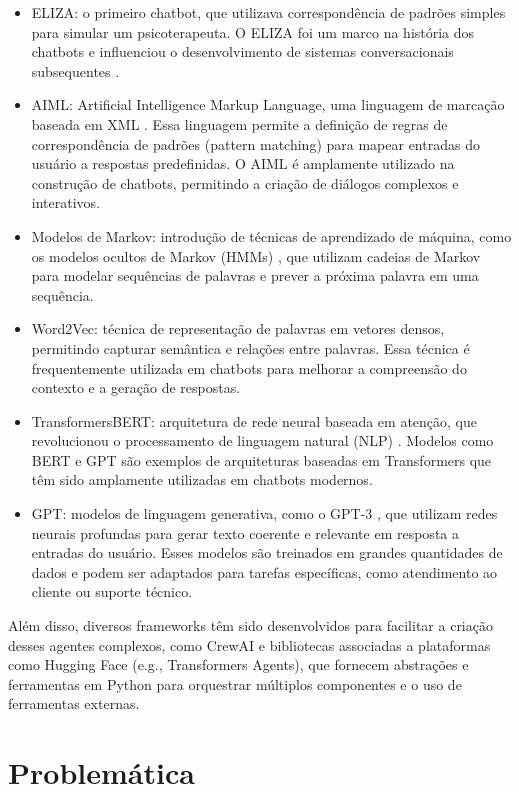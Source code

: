\documentclass[14pt,a4paper,oneside]{book}
\begin{document}
\begin{itemize}
	\item ELIZA: o primeiro chatbot, que utilizava correspondência de padrões simples para simular um psicoterapeuta. O ELIZA foi um marco na história dos chatbots e influenciou o desenvolvimento de sistemas conversacionais subsequentes \cite{Weizenbaum1996}.
	\item AIML: Artificial Intelligence Markup Language, uma linguagem de marcação baseada em XML \cite{Wallace2000}. Essa linguagem permite a definição de regras de correspondência de padrões (pattern matching) para mapear entradas do usuário a respostas predefinidas. O AIML é amplamente utilizado na construção de chatbots, permitindo a criação de diálogos complexos e interativos.
	\item Modelos de Markov: introdução de técnicas de aprendizado de máquina, como os modelos ocultos de Markov (HMMs) , que utilizam cadeias de Markov para modelar sequências de palavras e prever a próxima palavra em uma sequência. %
	\item Word2Vec: técnica de representação de palavras em vetores densos, permitindo capturar semântica e relações entre palavras. Essa técnica é frequentemente utilizada em chatbots para melhorar a compreensão do contexto e a geração de respostas. %
	\item TransformersBERT: arquitetura de rede neural baseada em atenção, que revolucionou o processamento de linguagem natural (NLP) \cite{Vaswani2017}. Modelos como BERT  e GPT  são exemplos de arquiteturas baseadas em Transformers que têm sido amplamente utilizadas em chatbots modernos. %
	\item GPT: modelos de linguagem generativa, como o GPT-3 , que utilizam redes neurais profundas para gerar texto coerente e relevante em resposta a entradas do usuário. Esses modelos são treinados em grandes quantidades de dados e podem ser adaptados para tarefas específicas, como atendimento ao cliente ou suporte técnico. %
\end{itemize}

Além disso, diversos frameworks têm sido desenvolvidos para facilitar a criação desses agentes complexos, como CrewAI e bibliotecas associadas a plataformas como Hugging Face (e.g., Transformers Agents), que fornecem abstrações e ferramentas em Python para orquestrar múltiplos componentes e o uso de ferramentas externas.

\section{Problemática}	
\end{document}
